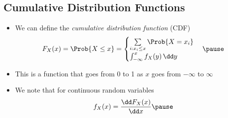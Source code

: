 
\begin{slide}
\section{Cumulative Distribution Functions}
  
\begin{PauseHighLight}
  \begin{itemize}
  \item We can define the \emph{cumulative distribution function} (CDF)
    \begin{align*}
      F_X(x) = \Prob{X\leq x} =
      \begin{cases}
        \sum\limits_{i: x_i\leq x} \Prob{X=x_i} \\
        \int_{-\infty}^x f_X(y) \, \dd y
      \end{cases}\pause
    \end{align*}
  \item This is a function that goes from 0 to 1 as $x$ goes from
    $-\infty$ to $\infty$\pause
  \item We note that for continuous random variables
    \begin{align*}
      f_X(x) = \frac{\dd F_X(x)}{\dd x}\pause
    \end{align*}
  \end{itemize}
\end{PauseHighLight}

\end{slide}

\Outline %


